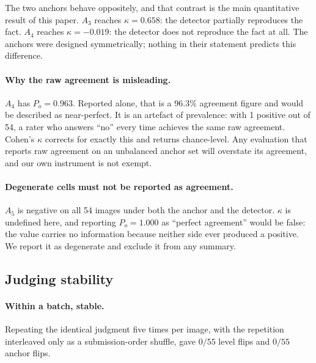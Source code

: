 \documentclass[11pt]{article}
\begin{document}
The two anchors behave oppositely, and that contrast is the main quantitative result of this paper. $A_3$ reaches $\kappa=0.658$: the detector partially reproduces the fact. $A_4$ reaches $\kappa=-0.019$: the detector does not reproduce the fact at all. The anchors were designed symmetrically; nothing in their statement predicts this difference.

\paragraph{Why the raw agreement is misleading.} $A_4$ has $P_o=0.963$. Reported alone, that is a 96.3\% agreement figure and would be described as near-perfect. It is an artefact of prevalence: with 1 positive out of 54, a rater who answers ``no'' every time achieves the same raw agreement. Cohen's $\kappa$ corrects for exactly this and returns chance-level. Any evaluation that reports raw agreement on an unbalanced anchor set will overstate its agreement, and our own instrument is not exempt.

\paragraph{Degenerate cells must not be reported as agreement.} $A_5$ is negative on all 54 images under both the anchor and the detector. $\kappa$ is undefined here, and reporting $P_o=1.000$ as ``perfect agreement'' would be false: the value carries no information because neither side ever produced a positive. We report it as degenerate and exclude it from any summary.

\subsection{Judging stability}
\paragraph{Within a batch, stable.} Repeating the identical judgment five times per image, with the repetition interleaved only as a submission-order shuffle, gave $0/55$ level flips and $0/55$ anchor flips.
\end{document}
